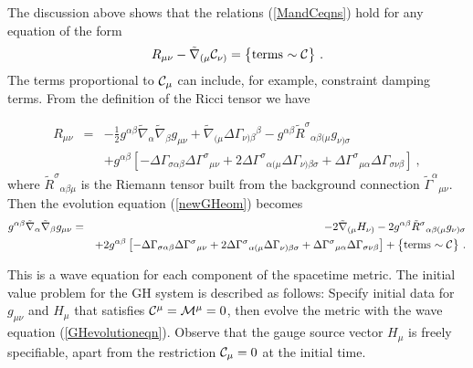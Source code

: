 \documentclass[letterpaper,nofootinbib,prd,amsmath,twocolumn]{revtex4-1}
\begin{document}
The discussion above shows that the relations (\ref{MandCeqns}) hold for any equation of the form 
\begin{equation}\label{newGHeom}
	R_{\mu\nu} - \tilde\nabla_{(\mu} {\cal C}_{\nu)} = \bigl\{ {\hbox{terms $\sim {\cal C}$}} \bigr\}  \ .
\end{equation}
The terms proportional to ${\cal C}_\mu$ can include, for example, constraint damping terms. 
From the definition of the Ricci tensor we have
\begin{widetext}
\begin{eqnarray}\label{RicciDef}
	R_{\mu\nu} & = & -\frac{1}{2} g^{\alpha\beta} \tilde\nabla_\alpha \tilde\nabla_\beta 
		g_{\mu\nu} + \tilde\nabla_{(\mu} \Delta\Gamma_{\nu)\beta}{}^\beta - g^{\alpha\beta} 
		\tilde R^\sigma{}_{\alpha\beta(\mu} g_{\nu)\sigma} \nonumber\\
	& & + g^{\alpha\beta} \left[ -\Delta\Gamma_{\sigma\alpha\beta}\Delta\Gamma^\sigma{}_{\mu\nu} 
		+ 2\Delta\Gamma^\sigma{}_{\alpha(\mu}\Delta\Gamma_{\nu)\beta\sigma} 
		+ \Delta\Gamma^\sigma{}_{\mu\alpha} \Delta\Gamma_{\sigma\nu\beta} \right] \ ,
\end{eqnarray}
where $\tilde R^\sigma{}_{\alpha\beta\mu}$ is the Riemann tensor built from 
the background connection $\tilde \Gamma^\alpha{}_{\mu\nu}$. 
Then the evolution equation (\ref{newGHeom}) becomes 
\begin{eqnarray}\label{GHevolutioneqn}
	g^{\alpha\beta} \tilde\nabla_\alpha \tilde\nabla_\beta g_{\mu\nu} 
	& = & - 2\tilde\nabla_{(\mu} H_{\nu)}  - 2g^{\alpha\beta} 
		\tilde R^\sigma{}_{\alpha\beta(\mu} g_{\nu)\sigma} \nonumber\\
	& &  + 2g^{\alpha\beta} \left[ -\Delta\Gamma_{\sigma\alpha\beta}\Delta\Gamma^\sigma{}_{\mu\nu} 
		+ 2\Delta\Gamma^\sigma{}_{\alpha(\mu}\Delta\Gamma_{\nu)\beta\sigma} 
		+ \Delta\Gamma^\sigma{}_{\mu\alpha} \Delta\Gamma_{\sigma\nu\beta} \right] 
		+ \bigl\{ {\hbox{terms $\sim {\cal C}$}} \bigr\}  \ .
\end{eqnarray}
\end{widetext}
This is a wave equation for each component of the spacetime metric. The initial value problem for the GH system is
described as follows: Specify initial data for $g_{\mu\nu}$ and $H_\mu$ that satisfies 
${\cal C}^\mu  = {\cal M}^\mu = 0$, then evolve the metric 
with the wave equation (\ref{GHevolutioneqn}). Observe that the gauge source vector $H_\mu$ 
is freely specifiable, apart from the restriction ${\cal C}_\mu = 0$ at the initial time.  

\end{document}
